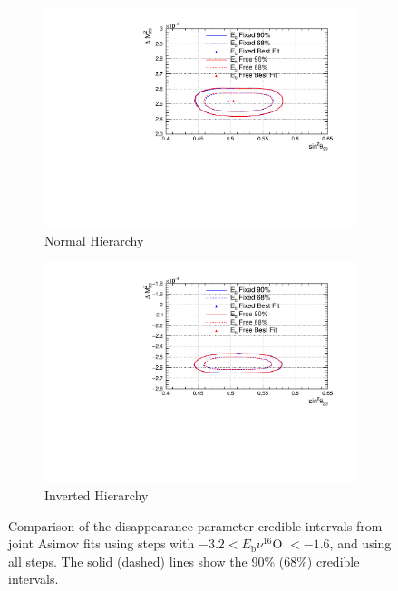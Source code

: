 \begin{figure}[!htbp]
\centering
\begin{subfigure}{.7\textwidth}
  \centering
  \includegraphics[width=0.95\linewidth]{figs/compMaCh3Contours_EB_asimov/compMaCh3Contours_EB_disapp_asimovA_NH}
  \caption{Normal Hierarchy}
  \label{fig:EBDisNH}
\end{subfigure}
\begin{subfigure}{.7\textwidth}
  \centering
  \includegraphics[width=0.95\linewidth]{figs/compMaCh3Contours_EB_asimov/compMaCh3Contours_EB_disapp_asimovA_IH}
  \caption{Inverted Hierarchy}
  \label{fig:EBDisIH}
\end{subfigure}
\caption{Comparison of the disappearance parameter credible intervals from joint Asimov fits using steps with $ -3.2 < E_{\mathrm{b}} \nu ^{16}$O $< -1.6$, and using all steps. The solid (dashed) lines show the 90$\%$ ($68\%$) credible intervals.}
\label{fig:EBDis}
\end{figure}

